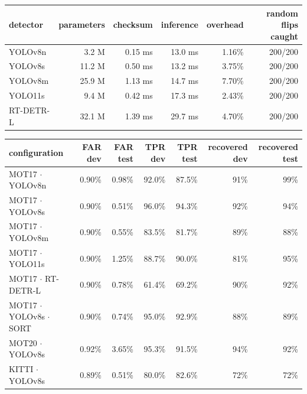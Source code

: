 \begin{tabular}{lrrrrr}
\toprule
detector & parameters & checksum & inference & overhead & random flips caught \\
\midrule
YOLOv8n & 3.2 M & 0.15 ms & 13.0 ms & 1.16\% & 200/200 \\
YOLOv8s & 11.2 M & 0.50 ms & 13.2 ms & 3.75\% & 200/200 \\
YOLOv8m & 25.9 M & 1.13 ms & 14.7 ms & 7.70\% & 200/200 \\
YOLO11s & 9.4 M & 0.42 ms & 17.3 ms & 2.43\% & 200/200 \\
RT-DETR-L & 32.1 M & 1.39 ms & 29.7 ms & 4.70\% & 200/200 \\
\bottomrule
\end{tabular}

\begin{tabular}{lrrrrrr}
\toprule
configuration & FAR dev & FAR test & TPR dev & TPR test & recovered dev & recovered test \\
\midrule
MOT17 $\cdot$ YOLOv8n & 0.90\% & 0.98\% & 92.0\% & 87.5\% & 91\% & 99\% \\
MOT17 $\cdot$ YOLOv8s & 0.90\% & 0.51\% & 96.0\% & 94.3\% & 92\% & 94\% \\
MOT17 $\cdot$ YOLOv8m & 0.90\% & 0.55\% & 83.5\% & 81.7\% & 89\% & 88\% \\
MOT17 $\cdot$ YOLO11s & 0.90\% & 1.25\% & 88.7\% & 90.0\% & 81\% & 95\% \\
MOT17 $\cdot$ RT-DETR-L & 0.90\% & 0.78\% & 61.4\% & 69.2\% & 90\% & 92\% \\
MOT17 $\cdot$ YOLOv8s $\cdot$ SORT & 0.90\% & 0.74\% & 95.0\% & 92.9\% & 88\% & 89\% \\
MOT20 $\cdot$ YOLOv8s & 0.92\% & 3.65\% & 95.3\% & 91.5\% & 94\% & 92\% \\
KITTI $\cdot$ YOLOv8s & 0.89\% & 0.51\% & 80.0\% & 82.6\% & 72\% & 72\% \\
\bottomrule
\end{tabular}
